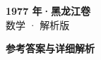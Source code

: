 \documentclass[zihao=-4, a4paper]{ctexart}
\begin{document}
\begin{center}
  {\Large\bfseries 1977 年·黑龙江卷}\\[4pt]
  {\large 数学 · 解析版}
\end{center}
\medskip
{}

\clearpage
{}
\begin{center}{\Large\bfseries 参考答案与详细解析}\end{center}
\medskip

\end{document}
